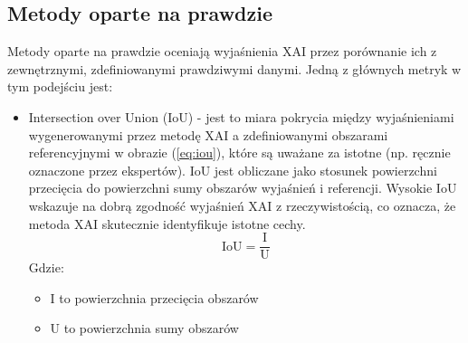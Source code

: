 \subsection*{Metody oparte na prawdzie}
Metody oparte na prawdzie oceniają wyjaśnienia XAI przez porównanie ich z zewnętrznymi, zdefiniowanymi prawdziwymi danymi. Jedną z głównych metryk w tym podejściu jest:
\begin{itemize}
	\item Intersection over Union (IoU)\cite{9093360, XAIevalCNN} - jest to miara pokrycia między wyjaśnieniami wygenerowanymi przez metodę XAI a zdefiniowanymi obszarami referencyjnymi w obrazie (\ref{eq:iou}), które są uważane za istotne (np. ręcznie oznaczone przez ekspertów).
	      IoU jest obliczane jako stosunek powierzchni przecięcia do powierzchni sumy obszarów wyjaśnień i referencji. Wysokie IoU wskazuje na dobrą zgodność wyjaśnień XAI z rzeczywistością, co oznacza, że metoda XAI skutecznie identyfikuje istotne cechy.
	      \begin{equation}
		      \text{IoU} = \frac{\text{I}}{\text{U}}
		      \label{eq:iou}
	      \end{equation}
	      Gdzie:
	      \begin{itemize}
		      \item I to powierzchnia przecięcia obszarów
		      \item U to powierzchnia sumy obszarów
	      \end{itemize}
\end{itemize}


